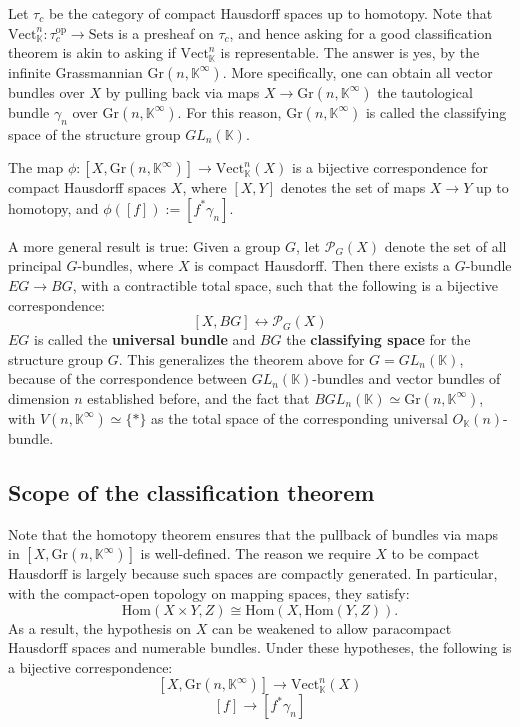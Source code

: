 \documentclass[11pt,a4paper]{article}
\begin{document}
Let $\tau_c$ be the category of compact Hausdorff spaces up to homotopy. Note that $\text{Vect}_{\mathbb{K}}^n:\tau_c^{\text{op}}\to\text{Sets}$ is a presheaf on $\tau_c$, and hence asking for a good classification theorem is akin to asking if $\text{Vect}_{\mathbb{K}}^n$ is representable. The answer is yes, by the infinite Grassmannian $\text{Gr}(n, \mathbb{K}^{\infty})$. More specifically, one can obtain all vector bundles over $X$ by pulling back via maps $X\rightarrow \text{Gr}(n, \mathbb{K}^{\infty})$ the tautological bundle $\gamma_n$ over $\text{Gr}(n, \mathbb{K}^{\infty})$. For this reason, $\text{Gr}(n, \mathbb{K}^{\infty})$ is called the classifying space of the structure group $GL_n(\mathbb{K})$.
\begin{theorem}
    \label{thm:vector-bundle-classification}
    The map $\phi: [X, \text{Gr}(n , \mathbb{K}^{\infty})] \rightarrow \text{Vect}_{\mathbb{K}}^n(X)$ is a bijective correspondence for compact Hausdorff spaces $X$, where $[X, Y]$ denotes the set of maps $X\rightarrow Y$ up to homotopy, and $\phi([f]):= [f^*\gamma_n]$.
\end{theorem}

\begin{remark}
A more general result is true: Given a group $G$, let $\mathcal{P}_G(X)$ denote the set of all principal $G$-bundles, where $X$ is compact Hausdorff. Then there exists a $G$-bundle $EG\rightarrow BG$, with a contractible total space, such that the following is a bijective correspondence:
$$[X, BG] \longleftrightarrow \mathcal{P}_G(X)$$
$EG$ is called the \textbf{universal bundle} and $BG$ the \textbf{classifying space} for the structure group $G$. This generalizes the theorem above for $G= GL_n{(\mathbb{K})}$, because of the correspondence between $GL_n{(\mathbb{K})}$-bundles and vector bundles of dimension $n$ established before, and the fact that $BGL_n{(\mathbb{K})} \simeq \text{Gr}(n, \mathbb{K}^{\infty})$, with $V(n, \mathbb{K}^{\infty}) \simeq \{*\}$ as the total space of the corresponding universal $O_{\mathbb K}(n)$-bundle.
\end{remark}

\subsection*{Scope of the classification theorem}
Note that the homotopy theorem ensures that the pullback of bundles via maps in $[X, \text{Gr}(n, \mathbb{K}^{\infty})]$ is well-defined. The reason we require $X$ to be compact Hausdorff is largely because such spaces are compactly generated. In particular, with the compact-open topology on mapping spaces, they satisfy:
$$\text{Hom}(X\times Y, Z) \cong \text{Hom}(X, \text{Hom}(Y, Z)).$$
As a result, the hypothesis on $X$ can be weakened to allow paracompact Hausdorff spaces and numerable bundles. Under these hypotheses, the following is a bijective correspondence:
$$[X, \text{Gr}(n, \mathbb{K}^{\infty})] \longrightarrow \text{Vect}_{\mathbb{K}}^n(X)$$
$$[f] \rightarrow [f^*\gamma_n]$$
\end{document}
